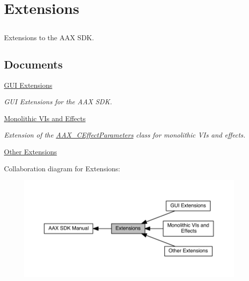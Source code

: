 \hypertarget{a00367}{}\section{Extensions}
\label{a00367}


\subsection{ }
Extensions to the A\+A\+X S\+D\+K. 

\subsection*{Documents}
\begin{DoxyCompactItemize}
\item 
\hyperlink{a00368}{G\+U\+I Extensions}
\begin{DoxyCompactList}\small\item\em G\+U\+I Extensions for the A\+A\+X S\+D\+K. \end{DoxyCompactList}\item 
\hyperlink{a00369}{Monolithic V\+Is and Effects}
\begin{DoxyCompactList}\small\item\em Extension of the \hyperlink{a00018}{A\+A\+X\+\_\+\+C\+Effect\+Parameters} class for monolithic V\+Is and effects. \end{DoxyCompactList}\item 
\hyperlink{a00370}{Other Extensions}
\end{DoxyCompactItemize}
Collaboration diagram for Extensions\+:
\nopagebreak
\begin{figure}[H]
\begin{center}
\leavevmode
\includegraphics[width=350pt]{a00367}
\end{center}
\end{figure}
